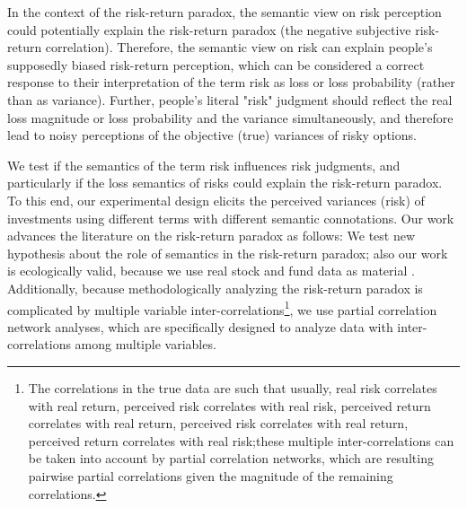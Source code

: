 \documentclass[a4paper,man, natbib,floatsintext]{apa6} %
\begin{document}
In the context of the risk-return paradox, the semantic view on risk perception could potentially explain the risk-return paradox (the negative subjective risk-return correlation).  Therefore, the semantic view on risk can explain people's supposedly biased risk-return perception, which can be considered a correct response to their interpretation of the term risk as loss or loss probability (rather than as variance).  Further, people's literal "risk" judgment should reflect the real loss magnitude or loss probability and the variance simultaneously, and therefore lead to noisy perceptions of the objective (true) variances of risky options.

We test if the semantics of the term risk influences risk judgments, and particularly if the loss semantics of risks could explain the risk-return paradox. To this end, our experimental design elicits the perceived variances (risk) of investments using different terms with different semantic connotations. Our work advances the literature on the risk-return paradox as follows: We test new hypothesis about the role of semantics in the risk-return paradox; also our work is ecologically valid, because we use real stock and fund data as material \citep[as also][]{Kempf2014}.  Additionally, because methodologically analyzing the risk-return paradox is complicated by multiple variable inter-correlations\footnote{The correlations in the true data are such that usually, real risk correlates with real return, perceived risk correlates with real risk,  perceived return correlates with real return, perceived risk correlates with real return, perceived return correlates with real risk;these multiple inter-correlations can be taken into account by partial correlation networks, which are resulting pairwise partial correlations given the magnitude of the remaining correlations.}, we use partial correlation network analyses, which are specifically designed to analyze data with inter-correlations among multiple variables.
\end{document}
